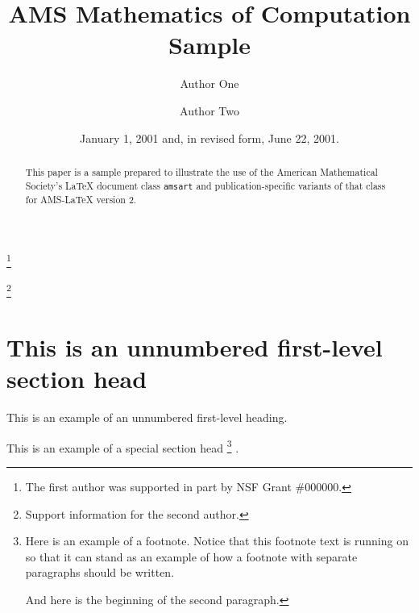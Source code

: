 \documentclass{mcom-l}
\theoremstyle{definition}
\theoremstyle{remark}
\numberwithin{equation}{section}
\begin{document}
\title{AMS Mathematics of Computation Sample}

\author{Author One}
\address{Department of Mathematics, Louisiana State University, Baton
Rouge, Louisiana 70803}
\thanks{The first author was supported in part by NSF Grant \#000000.}

\author{Author Two}
\address{Mathematical Research Section, School of Mathematical Sciences,
Australian National University, Canberra ACT 2601, Australia}
\thanks{Support information for the second author.}


\date{January 1, 2001 and, in revised form, June 22, 2001.}



\begin{abstract}
This paper is a sample prepared to illustrate the use of the American
Mathematical Society's \LaTeX{} document class \texttt{amsart} and
publication-specific variants of that class for AMS-\LaTeX{} version 2.
\end{abstract}

\maketitle

\section*{This is an unnumbered first-level section head}
This is an example of an unnumbered first-level heading.

This is an example of a special section head%
\footnote{Here is an example of a footnote. Notice that this footnote
text is running on so that it can stand as an example of how a footnote
with separate paragraphs should be written.
\par
And here is the beginning of the second paragraph.}%
.
\end{document}
